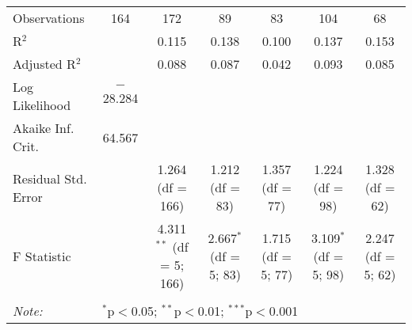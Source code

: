 \begin{table}[H]
\begin{tabular}{@{\extracolsep{5pt}}lcccccc}
Observations & 164 & 172 & 89 & 83 & 104 & 68 \\ 
R$^{2}$ &  & 0.115 & 0.138 & 0.100 & 0.137 & 0.153 \\ 
Adjusted R$^{2}$ &  & 0.088 & 0.087 & 0.042 & 0.093 & 0.085 \\ 
Log Likelihood & $-$28.284 &  &  &  &  &  \\ 
Akaike Inf. Crit. & 64.567 &  &  &  &  &  \\ 
Residual Std. Error &  & 1.264 (df = 166) & 1.212 (df = 83) & 1.357 (df = 77) & 1.224 (df = 98) & 1.328 (df = 62) \\ 
F Statistic &  & 4.311$^{**}$ (df = 5; 166) & 2.667$^{*}$ (df = 5; 83) & 1.715 (df = 5; 77) & 3.109$^{*}$ (df = 5; 98) & 2.247 (df = 5; 62) \\ 
\hline 
\hline \\[-1.8ex] 
\textit{Note:}  & \multicolumn{6}{l}{$^{*}$p$<$0.05; $^{**}$p$<$0.01; $^{***}$p$<$0.001} \\ 
\end{tabular} 
\end{table} 
